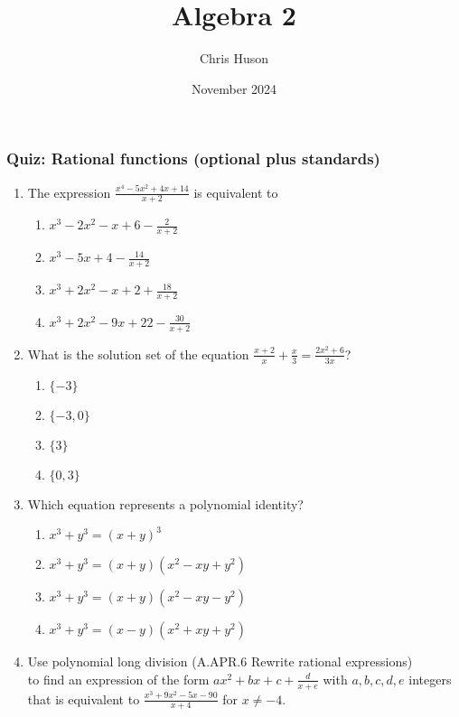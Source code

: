 \documentclass[12pt, twoside]{article}
\title{Algebra 2}
\author{Chris Huson}
\date{November 2024}
\begin{document}
\subsubsection*{Quiz: Rational functions (optional plus standards)}
\begin{enumerate}[itemsep=0.5cm]

    \item The expression $\displaystyle \frac{x^4 - 5x^2 + 4x + 14}{x+2}$ is equivalent to
    \begin{enumerate}
        \item $\displaystyle x^3 - 2x^2 - x + 6 - \frac{2}{x + 2}$
        \item $\displaystyle x^3 - 5x + 4 - \frac{14}{x + 2}$
        \item $\displaystyle x^3 + 2x^2 - x + 2 + \frac{18}{x + 2}$
        \item $\displaystyle x^3 + 2x^2 - 9x + 22 - \frac{30}{x + 2}$
    \end{enumerate}
    
    \item What is the solution set of the equation \(\displaystyle \frac{x+2}{x} + \frac{x}{3} = \frac{2x^2+6}{3x}\)?
    \begin{enumerate}
        \item \(\{-3\}\)
        \item \(\{-3, 0\}\)
        \item \(\{3\}\)
        \item \(\{0, 3\}\)
    \end{enumerate}
    
    \item Which equation represents a polynomial identity? %
    \begin{enumerate}
        \item \(x^3 + y^3 = (x + y)^3\)
        \item \(x^3 + y^3 = (x + y)(x^2 - xy + y^2)\)
        \item \(x^3 + y^3 = (x + y)(x^2 - xy - y^2)\)
        \item \(x^3 + y^3 = (x - y)(x^2 + xy + y^2)\)
    \end{enumerate}
    
\newpage 
\item Use polynomial long division \hfill (A.APR.6 Rewrite rational expressions) \\[0.5cm]
 to find an expression of the form $ax^2 + bx +c +\frac{d}{x+e}$ with $a,b,c,d,e$ integers that is equivalent to $\displaystyle \frac{x^3 + 9x^2 - 5x - 90}{x + 4}
$ for $x \neq -4$.
\vspace{10cm}


\end{enumerate}
\end{document}
